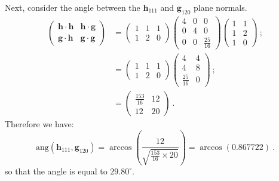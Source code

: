 \begin{example}
Next, consider the angle between the $\mathbf{h}_{111}$ and $\mathbf{g}_{120}$ plane normals.  
\begin{align*}
	\begin{pmatrix}\mathbf{h}\cdot\mathbf{h}&\mathbf{h}\cdot\mathbf{g}\\
	\mathbf{g}\cdot\mathbf{h}&\mathbf{g}\cdot\mathbf{g}\end{pmatrix} &= \begin{pmatrix}1 & 1 & 1\\ 1 & 2 & 0\end{pmatrix}
	\begin{pmatrix}
			4 & 0 & 0\\
			0 & 4 & 0\\
			0 & 0 & \frac{25}{16}\end{pmatrix}\begin{pmatrix} 1 & 1\\ 1 & 2\\ 1 & 0\end{pmatrix}\ ;\\
	&=\begin{pmatrix}1 & 1 & 1\\ 1 & 2 & 0\end{pmatrix}
	\begin{pmatrix} 4 & 4\\ 4 & 8\\ \frac{25}{16} & 0\end{pmatrix}\ ; \\
	&= \begin{pmatrix}\frac{153}{16} & 12 \\ 12 & 20 \end{pmatrix}\ .
\end{align*}
Therefore we have:
\[
	\text{ang}(\mathbf{h}_{111},\mathbf{g}_{120}) = \arccos\left(\frac{12}{\sqrt{\frac{153}{16}\times 20}}\right) = \arccos\left(0.867722\right) \ .
\]
so that the angle is equal to $29.80^{\circ}$.
\end{example}


